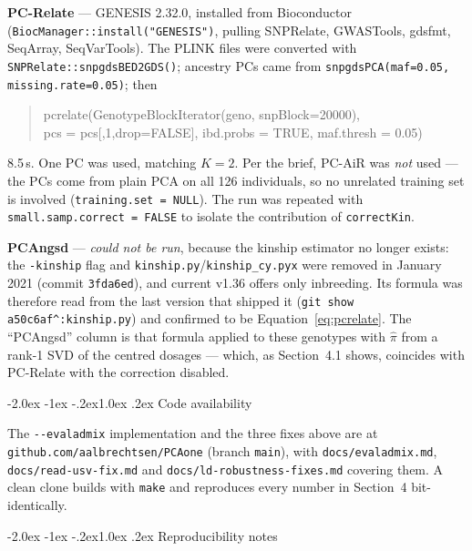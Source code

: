 \documentclass[10pt,a4paper]{article}
\makeatletter
\renewcommand\subsection{\@startsection{subsection}{2}{\z@}%
  {-2.0ex \@plus -1ex \@minus -.2ex}{1.0ex \@plus.2ex}%
  {\normalfont\normalsize\bfseries\color{hdr}}}
\makeatother
\begin{document}
\medskip\noindent
\textbf{PC-Relate} --- GENESIS 2.32.0, installed from Bioconductor
(\texttt{BiocManager::install("GENESIS")}, pulling SNPRelate, GWASTools, gdsfmt, SeqArray, SeqVarTools).
The PLINK files were converted with \texttt{SNPRelate::snpgdsBED2GDS()}; ancestry PCs came from
\texttt{snpgdsPCA(maf=0.05, missing.rate=0.05)}; then
\begin{quote}\ttfamily\small
pcrelate(GenotypeBlockIterator(geno, snpBlock=20000),\\
\hspace*{1em}pcs = pcs[,1,drop=FALSE], ibd.probs = TRUE, maf.thresh = 0.05)
\end{quote}
8.5\,s. One PC was used, matching $K=2$. Per the brief, PC-AiR was \emph{not} used --- the PCs come from
plain PCA on all 126 individuals, so no unrelated training set is involved (\texttt{training.set = NULL}).
The run was repeated with \texttt{small.samp.correct = FALSE} to isolate the contribution of
\texttt{correctKin}.

\medskip\noindent
\textbf{PCAngsd} --- \emph{could not be run}, because the kinship estimator no longer exists: the
\texttt{-kinship} flag and \texttt{kinship.py}/\texttt{kinship\_cy.pyx} were removed in January 2021
(commit \texttt{3fda6ed}), and current v1.36 offers only inbreeding. Its formula was therefore read from the
last version that shipped it (\texttt{git show a50c6af\^{}:kinship.py}) and confirmed to be
Equation~\eqref{eq:pcrelate}. The ``PCAngsd'' column is that formula applied to these genotypes with
$\hat\pi$ from a rank-1 SVD of the centred dosages --- which, as Section~4.1 shows, coincides with PC-Relate
with the correction disabled.

\subsection{Code availability}

The \texttt{-{}-evaladmix} implementation and the three fixes above are at
\texttt{github.com/aalbrechtsen/PCAone} (branch \texttt{main}), with
\texttt{docs/evaladmix.md}, \texttt{docs/read-usv-fix.md} and
\texttt{docs/ld-robustness-fixes.md} covering them. A clean clone builds with \texttt{make} and reproduces
every number in Section~4 bit-identically.

\subsection{Reproducibility notes}
\end{document}
